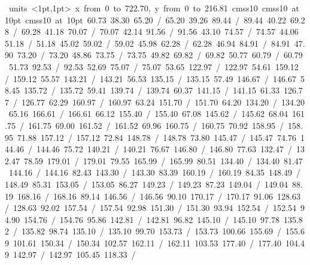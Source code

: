 \hbox{\beginpicture
\setcoordinatesystem units <1pt,1pt>
\setplotarea x from 0 to 722.70, y from 0 to 216.81
\setlinear
\font\picfont cmss10\picfont
\font\picfont cmss10 at 10pt\picfont
\font\picfont cmss10 at 10pt\picfont
\setsolid
{} 60.73 38.30 65.20 /
 65.20 39.26 89.44 /
 89.44 40.22 69.28 /
 69.28 41.18 70.07 /
 70.07 42.14 91.56 /
 91.56 43.10 74.57 /
 74.57 44.06 51.18 /
 51.18 45.02 59.02 /
 59.02 45.98 62.28 /
 62.28 46.94 84.91 /
 84.91 47.90 73.20 /
 73.20 48.86 73.75 /
 73.75 49.82 69.82 /
 69.82 50.77 60.79 /
 60.79 51.73 92.53 /
 92.53 52.69 75.07 /
 75.07 53.65 122.97 /
 122.97 54.61 159.12 /
 159.12 55.57 143.21 /
 143.21 56.53 135.15 /
 135.15 57.49 146.67 /
 146.67 58.45 135.72 /
 135.72 59.41 139.74 /
 139.74 60.37 141.15 /
 141.15 61.33 126.77 /
 126.77 62.29 160.97 /
 160.97 63.24 151.70 /
 151.70 64.20 134.20 /
 134.20 65.16 166.61 /
 166.61 66.12 155.40 /
 155.40 67.08 145.62 /
 145.62 68.04 161.75 /
 161.75 69.00 161.52 /
 161.52 69.96 160.75 /
 160.75 70.92 158.95 /
 158.95 71.88 157.12 /
 157.12 72.84 148.78 /
 148.78 73.80 145.47 /
 145.47 74.76 144.46 /
 144.46 75.72 140.21 /
 140.21 76.67 146.80 /
 146.80 77.63 132.47 /
 132.47 78.59 179.01 /
 179.01 79.55 165.99 /
 165.99 80.51 134.40 /
 134.40 81.47 144.16 /
 144.16 82.43 143.30 /
 143.30 83.39 160.19 /
 160.19 84.35 148.49 /
 148.49 85.31 153.05 /
 153.05 86.27 149.23 /
 149.23 87.23 149.04 /
 149.04 88.19 168.16 /
 168.16 89.14 146.56 /
 146.56 90.10 170.17 /
 170.17 91.06 128.63 /
 128.63 92.02 157.54 /
 157.54 92.98 151.30 /
 151.30 93.94 152.54 /
 152.54 94.90 154.76 /
 154.76 95.86 142.81 /
 142.81 96.82 145.10 /
 145.10 97.78 135.82 /
 135.82 98.74 135.10 /
 135.10 99.70 153.73 /
 153.73 100.66 155.69 /
 155.69 101.61 150.34 /
 150.34 102.57 162.11 /
 162.11 103.53 177.40 /
 177.40 104.49 142.97 /
 142.97 105.45 118.33 /
}
